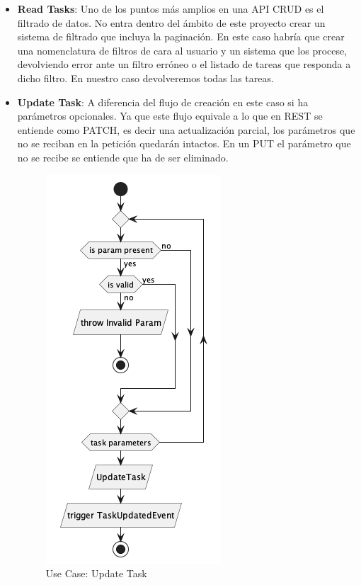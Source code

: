 \begin{itemize}
    \item \textbf{Read Tasks}: Uno de los puntos más amplios en una API CRUD es el filtrado de datos.
    No entra dentro del ámbito de este proyecto crear un sistema de filtrado que incluya la paginación.
    En este caso habría que crear una nomenclatura de filtros de cara al usuario y un sistema que los procese, devolviendo error ante un filtro erróneo o el listado de tareas que responda a dicho filtro.
    En nuestro caso devolveremos todas las tareas.

    \item \textbf{Update Task}: A diferencia del flujo de creación en este caso si ha parámetros opcionales.
    Ya que este flujo equivale a lo que en \gls{REST} se entiende como PATCH, es decir una actualización parcial, los parámetros que no se reciban en la petición quedarán intactos.
    En un PUT el parámetro que no se recibe se entiende que ha de ser eliminado.

    \begin{figure}[H]
        \centering
        \includegraphics[height=0.4\textheight]{./part/Proyecto_ejecutivo/memoria_descriptiva/descripcionDelProyecto/manager/uml/updateTaskUseCase}
        \caption{Use Case: Update Task}\label{fig:Use Case-Update Task}
    \end{figure}


\end{itemize}
